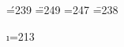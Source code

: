 
\def\b#1{\oalign{#1\crcr\hidewidth
    \vbox to.2ex{\hbox{\char238}\vss}\hidewidth}}
\def\c#1{\setbox0\hbox{#1}\ifdim\ht0=1ex\accent184 #1%
  \else{\ooalign{\hidewidth\char247\hidewidth\crcr\unhbox0}}\fi}



\chardef\'=239	%
\chardef\"=249	%
\chardef\c=247	%
\chardef\==238	%

\chardef\i=213





\def\grave{\mathaccent"7060 }	%
\def\acute{\mathaccent"70EF }	%
\def\hat{\mathaccent"705E }	%
\def\tilde{\mathaccent"707E }	%
\def\ddot{\mathaccent"70FA }	%
\def\bar{\mathaccent"70EE }	%

